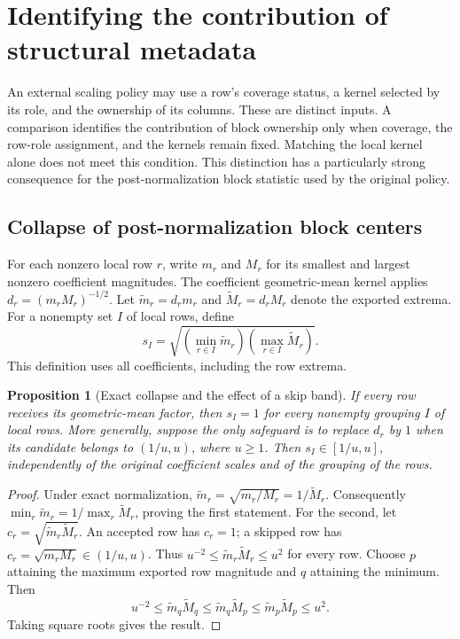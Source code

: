 \newtheorem{auditproposition}{Proposition}[section]
\section{Identifying the contribution of structural metadata}
\label{sec:identifiability}

An external scaling policy may use a row's coverage status, a kernel selected by its
role, and the ownership of its columns. These are distinct inputs. A comparison
identifies the contribution of block ownership only when coverage, the row-role
assignment, and the kernels remain fixed. Matching the local kernel alone does not
meet this condition. This distinction has a particularly strong consequence for
the post-normalization block statistic used by the original policy.

\subsection{Collapse of post-normalization block centers}

For each nonzero local row $r$, write $m_r$ and $M_r$ for its smallest and largest
nonzero coefficient magnitudes. The coefficient geometric-mean kernel applies
$d_r=(m_rM_r)^{-1/2}$. Let $\widetilde m_r=d_rm_r$ and
$\widetilde M_r=d_rM_r$ denote the exported extrema. For a nonempty set $I$ of local
rows, define
\[
 s_I=\sqrt{\left(\min_{r\in I}\widetilde m_r\right)
                 \left(\max_{r\in I}\widetilde M_r\right)}.
\]
This definition uses all coefficients, including the row extrema.

\begin{auditproposition}[Exact collapse and the effect of a skip band]
\label{prop:audit-collapse}
If every row receives its geometric-mean factor, then $s_I=1$ for every
nonempty grouping $I$ of local rows. More generally, suppose the only safeguard is
to replace $d_r$ by $1$ when its candidate belongs to $(1/u,u)$, where $u\geq1$.
Then $s_I\in[1/u,u]$, independently of the original coefficient scales and of the
grouping of the rows.
\end{auditproposition}
\begin{proof}
Under exact normalization,
$\widetilde m_r=\sqrt{m_r/M_r}=1/\widetilde M_r$. Consequently
$\min_r\widetilde m_r=1/\max_r\widetilde M_r$, proving the first statement.
For the second, let $c_r=\sqrt{\widetilde m_r\widetilde M_r}$. An accepted row has
$c_r=1$; a skipped row has $c_r=\sqrt{m_rM_r}\in(1/u,u)$. Thus
$u^{-2}\leq\widetilde m_r\widetilde M_r\leq u^2$ for every row. Choose $p$ attaining
the maximum exported row magnitude and $q$ attaining the minimum. Then
\[
 u^{-2}\leq\widetilde m_q\widetilde M_q
 \leq\widetilde m_q\widetilde M_p
 \leq\widetilde m_p\widetilde M_p\leq u^2.
\]
Taking square roots gives the result.
\end{proof}


